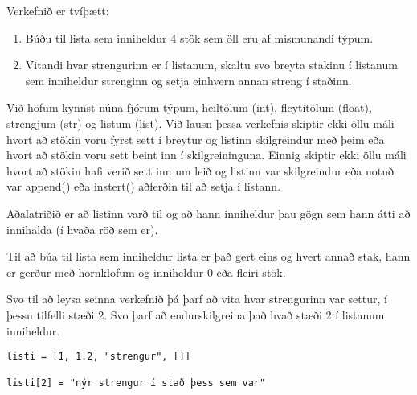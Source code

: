 \begin{exercise}\label{lst2}
		Verkefnið er tvíþætt:
\begin{enumerate}

	\item Búðu til lista sem inniheldur 4 stök sem öll eru af mismunandi týpum.
	\item Vitandi hvar strengurinn er í listanum, skaltu svo breyta stakinu í listanum sem inniheldur strenginn og setja einhvern annan streng í staðinn.
\end{enumerate}
\end{exercise}
\begin{Answer}[ref={lst2}]
Við höfum kynnst núna fjórum týpum, heiltölum (int), fleytitölum (float), strengjum (str) og listum (list).
Við lausn þessa verkefnis skiptir ekki öllu máli hvort að stökin voru fyrst sett í breytur og listinn skilgreindur með þeim eða hvort að stökin voru sett beint inn í skilgreininguna.
Einnig skiptir ekki öllu máli hvort að stökin hafi verið sett inn um leið og listinn var skilgreindur eða notuð var append() eða instert() aðferðin til að setja í listann.

Aðalatriðið er að listinn varð til og að hann inniheldur þau gögn sem hann átti að innihalda (í hvaða röð sem er).

Til að búa til lista sem inniheldur lista er það gert eins og hvert annað stak, hann er gerður með hornklofum og inniheldur 0 eða fleiri stök.

Svo til að leysa seinna verkefnið þá þarf að vita hvar strengurinn var settur, í þessu tilfelli stæði 2.
Svo þarf að endurskilgreina það hvað stæði 2 í listanum inniheldur. 
\begin{lstlisting}
listi = [1, 1.2, "strengur", []]

listi[2] = "nýr strengur í stað þess sem var"\end{lstlisting}
\end{Answer}

